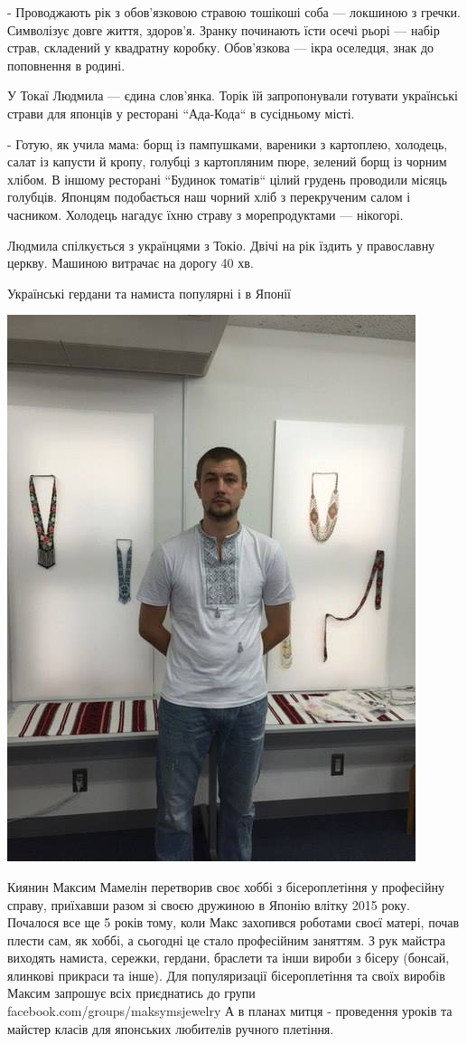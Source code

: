 \documentclass[10pt,a4paper]{article}
\newcommand{\NewsItem}[1]{%
		\usefont{T2A}{iwona}{m}{n} 
		\large #1 \vspace{4pt}
		\par \normalsize \normalfont}
\newcommand{\NewsAuthor}[1]{%
			\hfill \textsc{#1} \vspace{4pt}
			\par \normalfont}
\begin{document}
\begin{multicols}{3}
- Проводжають рік з обов'язковою стравою тошікоші соба — локшиною з гречки. Символізує довге життя, здоров'я. Зранку починають їсти осечі рьорі — набір страв, складений у квадратну коробку. Обов'язкова — ікра оселедця, знак до поповнення в родині.

У Токаї Людмила — єдина слов'янка. Торік їй запропонували готувати українські страви для японців у ресторані ``Ада-Кода`` в сусідньому місті.

- Готую, як учила мама: борщ із пампушками, вареники з картоплею, холодець, салат із капусти й кропу, голубці з картопляним пюре, зелений борщ із чорним хлібом. В іншому ресторані ``Будинок томатів`` цілий грудень проводили місяць голубців. Японцям подобається наш чорний хліб з перекрученим салом і часником. Холодець нагадує їхню страву з морепродуктами — нікогорі.

Людмила спілкується з українцями з Токіо. Двічі на рік їздить у православну церкву. Машиною витрачає на дорогу 40 хв.

\vspace{1cm}

\NewsItem{Українські гердани та намиста популярні і в Японії}
\begin{center}
\includegraphics[width=0.8\linewidth]{images/8}
\end{center}
Киянин Максим Мамелін перетворив своє хоббі з бісероплетіння у професійну справу, приїхавши разом зі своєю дружиною в Японію влітку 2015 року. Почалося все ще 5 років тому, коли Макс захопився роботами своєї матері, почав плести сам, як хоббі, а сьогодні це стало професійним заняттям. З рук майстра виходять намиста, сережки, гердани, браслети та інши вироби з бісеру (бонсай, ялинкові прикраси та інше). Для популяризації бісероплетіння та своїх виробів Максим запрошує всіх приєднатись до групи facebook.com/groups/maksymsjewelry А в планах митця - проведення уроків та майстер класів для японських любителів ручного плетіння.


\end{multicols}
\end{document}
